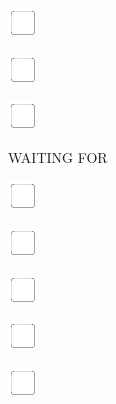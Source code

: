 \documentclass[11pt,titlepage]{article}
\begin{document}
\vspace{10mm}

\noindent
\includegraphics[]{checkbox-4mm.pdf}

\vspace{10mm}

\noindent
\includegraphics[]{checkbox-4mm.pdf}

\vspace{10mm}

\noindent
\includegraphics[]{checkbox-4mm.pdf}

\pagebreak

\small %
\hfill WAITING FOR

\vspace{6mm}

\noindent
\includegraphics[]{checkbox-4mm.pdf}

\vspace{10mm}

\noindent
\includegraphics[]{checkbox-4mm.pdf}

\vspace{10mm}

\noindent
\includegraphics[]{checkbox-4mm.pdf}

\vspace{10mm}

\noindent
\includegraphics[]{checkbox-4mm.pdf}

\vspace{10mm}

\noindent
\includegraphics[]{checkbox-4mm.pdf}
\end{document}

